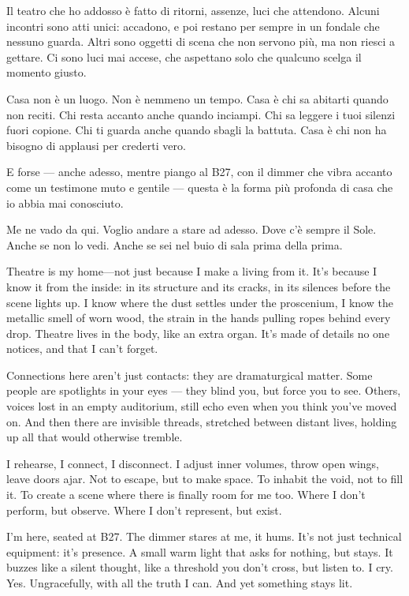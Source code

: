 {Il teatro che ho addosso è fatto di ritorni, assenze, luci che attendono.
Alcuni incontri sono atti unici: accadono, e poi restano per sempre in un fondale che nessuno guarda.
Altri sono oggetti di scena che non servono più, ma non riesci a gettare.
Ci sono luci mai accese, che aspettano solo che qualcuno scelga il momento giusto.

Casa non è un luogo.
Non è nemmeno un tempo.
Casa è chi sa abitarti quando non reciti.
Chi resta accanto anche quando inciampi.
Chi sa leggere i tuoi silenzi fuori copione.
Chi ti guarda anche quando sbagli la battuta.
Casa è chi non ha bisogno di applausi per crederti vero.

E forse — anche adesso, mentre piango al B27,
con il dimmer che vibra accanto come un testimone muto e gentile —
questa è la forma più profonda di casa che io abbia mai conosciuto.

Me ne vado da qui.
Voglio andare a stare ad adesso.
Dove c’è sempre il Sole.
Anche se non lo vedi.
Anche se sei nel buio di sala prima della prima.}{Theatre is my home—not just because I make a living from it.
It’s because I know it from the inside: in its structure and its cracks, in its silences before the scene lights up.
I know where the dust settles under the proscenium, I know the metallic smell of worn wood, the strain in the hands pulling ropes behind every drop.
Theatre lives in the body, like an extra organ.
It’s made of details no one notices, and that I can’t forget.

Connections here aren’t just contacts: they are dramaturgical matter.
Some people are spotlights in your eyes — they blind you, but force you to see.
Others, voices lost in an empty auditorium, still echo even when you think you’ve moved on.
And then there are invisible threads, stretched between distant lives, holding up all that would otherwise tremble.

I rehearse, I connect, I disconnect.
I adjust inner volumes, throw open wings, leave doors ajar.
Not to escape, but to make space.
To inhabit the void, not to fill it.
To create a scene where there is finally room for me too.
Where I don’t perform, but observe. Where I don’t represent, but exist.

I’m here, seated at B27.
The dimmer stares at me, it hums.
It’s not just technical equipment: it’s presence.
A small warm light that asks for nothing, but stays.
It buzzes like a silent thought, like a threshold you don’t cross, but listen to.
I cry. Yes. Ungracefully, with all the truth I can.
And yet something stays lit.

}
